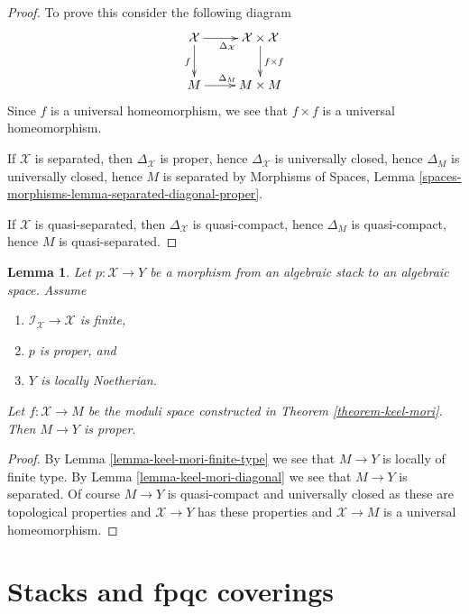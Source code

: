 \documentclass{stacks-project}
\theoremstyle{plain}
\newtheorem{lemma}[subsection]{Lemma}
\theoremstyle{definition}
\theoremstyle{remark}
\numberwithin{equation}{subsection}
\begin{document}
\begin{proof}
To prove this consider the following diagram
$$
\xymatrix{
\mathcal{X} \ar[d]_f \ar[r]_{\Delta_\mathcal{X}} &
\mathcal{X} \times \mathcal{X} \ar[d]^{f \times f} \\
M \ar[r]^{\Delta_M} &
M \times M
}
$$
Since $f$ is a universal homeomorphism, we see that
$f \times f$ is a universal homeomorphism.

\medskip\noindent
If $\mathcal{X}$ is separated, then $\Delta_\mathcal{X}$ is proper,
hence $\Delta_\mathcal{X}$ is universally closed, hence
$\Delta_M$ is universally closed, hence $M$ is separated
by Morphisms of Spaces, Lemma
\ref{spaces-morphisms-lemma-separated-diagonal-proper}.

\medskip\noindent
If $\mathcal{X}$ is quasi-separated, then $\Delta_\mathcal{X}$ is
quasi-compact, hence $\Delta_M$ is quasi-compact, hence $M$ is
quasi-separated.
\end{proof}

\begin{lemma}
\label{lemma-keel-mori-proper}
Let $p : \mathcal{X} \to Y$ be a morphism from an algebraic stack
to an algebraic space. Assume
\begin{enumerate}
\item $\mathcal{I}_\mathcal{X} \to \mathcal{X}$ is finite,
\item $p$ is proper, and
\item $Y$ is locally Noetherian.
\end{enumerate}
Let $f : \mathcal{X} \to M$ be the moduli space constructed in
Theorem \ref{theorem-keel-mori}. Then $M \to Y$ is proper.
\end{lemma}

\begin{proof}
By Lemma \ref{lemma-keel-mori-finite-type}
we see that $M \to Y$ is locally of finite type.
By Lemma \ref{lemma-keel-mori-diagonal} we see that
$M \to Y$ is separated.
Of course $M \to Y$ is quasi-compact and universally closed
as these are topological properties and $\mathcal{X} \to Y$
has these properties and $\mathcal{X} \to M$ is a universal
homeomorphism.
\end{proof}





\section{Stacks and fpqc coverings}
\label{section-fpqc}
\end{document}
